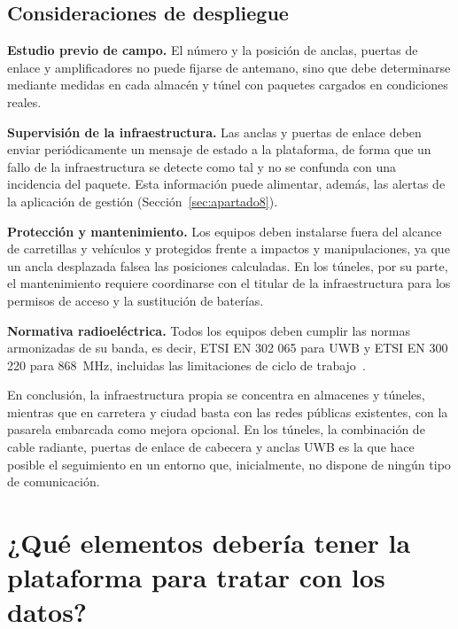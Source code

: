 \documentclass[11pt,a4paper]{article}
\begin{document}
\subsection{Consideraciones de despliegue}
\label{sec:apartado6_6}

\textbf{Estudio previo de campo.} El número y la posición de anclas, puertas de enlace y amplificadores no puede fijarse de antemano, sino que debe determinarse mediante medidas en cada almacén y túnel con paquetes cargados en condiciones reales.

\textbf{Supervisión de la infraestructura.} Las anclas y puertas de enlace deben enviar periódicamente un mensaje de estado a la plataforma, de forma que un fallo de la infraestructura se detecte como tal y no se confunda con una incidencia del paquete. Esta información puede alimentar, además, las alertas de la aplicación de gestión (Sección~\ref{sec:apartado8}).

\textbf{Protección y mantenimiento.} Los equipos deben instalarse fuera del alcance de carretillas y vehículos y protegidos frente a impactos y manipulaciones, ya que un ancla desplazada falsea las posiciones calculadas. En los túneles, por su parte, el mantenimiento requiere coordinarse con el titular de la infraestructura para los permisos de acceso y la sustitución de baterías.

\textbf{Normativa radioeléctrica.} Todos los equipos deben cumplir las normas armonizadas de su banda, es decir, ETSI EN 302 065 para UWB y ETSI EN 300 220 para 868~MHz, incluidas las limitaciones de ciclo de trabajo~\cite{ref26,ref40,ref28}.

En conclusión, la infraestructura propia se concentra en almacenes y túneles, mientras que en carretera y ciudad basta con las redes públicas existentes, con la pasarela embarcada como mejora opcional. En los túneles, la combinación de cable radiante, puertas de enlace de cabecera y anclas UWB es la que hace posible el seguimiento en un entorno que, inicialmente, no dispone de ningún tipo de comunicación.

\clearpage
\section{¿Qué elementos debería tener la plataforma para tratar con los datos?}
\label{sec:apartado7}
\end{document}
